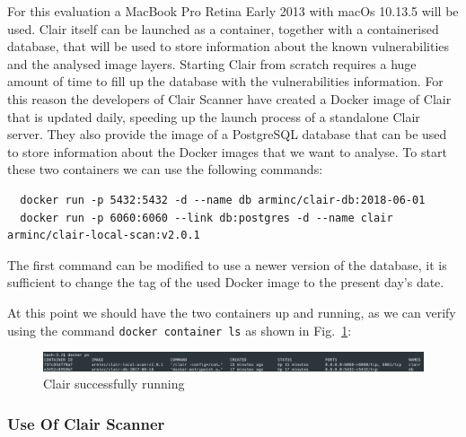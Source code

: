 \documentclass[a4paper,12pt]{article}
\newcommand{\code}[1]{\lstinline|#1|}
\def\myfig#1{Fig.~#1\xspace}
\begin{document}
For this evaluation a MacBook Pro Retina Early 2013 with macOs 10.13.5 will be
used. Clair itself can be launched as a container, together with a containerised
database, that will be used to store information about the known vulnerabilities
and the analysed image layers. Starting Clair from scratch requires a huge
amount of time to fill up the database with the vulnerabilities information. For
this reason the developers of Clair Scanner have created a Docker image of Clair
that is updated daily, speeding up the launch process of a standalone Clair
server. They also provide the image of a PostgreSQL database that can be used to
store information about the Docker images that we want to analyse. To start
these two containers we can use the following commands: 
\begin{lstlisting}
  docker run -p 5432:5432 -d --name db arminc/clair-db:2018-06-01
  docker run -p 6060:6060 --link db:postgres -d --name clair arminc/clair-local-scan:v2.0.1
\end{lstlisting}
The first command can be modified to use a newer version of the database, it is
sufficient to change the tag of the used Docker image to the present day's date.
\par At this point we should have the two containers up and running, as we can
verify using the command \code{docker container ls} as shown in
\myfig{\ref{fig:clair_running}}: 

\begin{figure}[ht!]
  \centerline{\includegraphics[width=1\textwidth]{clair_running.png}}
  \caption{Clair successfully running}
  \label{fig:clair_running}
  \end{figure}

\subsubsection{Use Of Clair Scanner}
\end{document}
